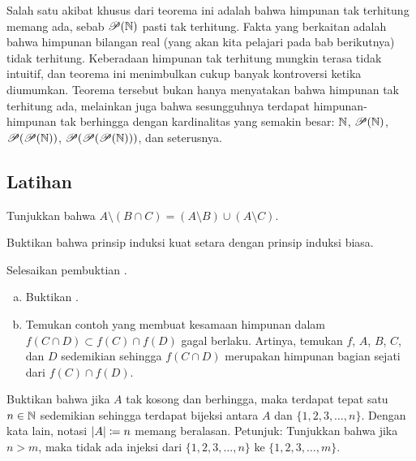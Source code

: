 Salah satu akibat khusus dari 
teorema ini adalah bahwa himpunan tak terhitung memang ada,
sebab ${\mathscr{P}}({\mathbb{N}})$ pasti tak terhitung.
Fakta yang berkaitan adalah bahwa
himpunan bilangan real (yang akan kita pelajari pada bab berikutnya) tidak terhitung.
Keberadaan himpunan tak terhitung mungkin terasa tidak intuitif, dan teorema ini
menimbulkan cukup banyak kontroversi ketika
diumumkan.  Teorema tersebut bukan hanya menyatakan bahwa himpunan tak terhitung ada,
melainkan juga bahwa sesungguhnya terdapat himpunan-himpunan tak berhingga dengan kardinalitas
yang semakin besar: ${\mathbb{N}}$, ${\mathscr{P}}({\mathbb{N}})$,
${\mathscr{P}}({\mathscr{P}}({\mathbb{N}}))$, ${\mathscr{P}}({\mathscr{P}}({\mathscr{P}}({\mathbb{N}})))$, dan seterusnya.

\subsection{Latihan}

\begin{exercise}
Tunjukkan bahwa
$A \setminus (B \cap C) = (A \setminus B) \cup (A \setminus C)$.
\end{exercise}

\begin{exercise}
Buktikan bahwa prinsip induksi kuat setara dengan prinsip induksi
biasa.
\end{exercise}

\begin{exercise}
Selesaikan pembuktian .
\end{exercise}

\begin{exercise}
\leavevmode
\begin{enumerate}[a)]
\item
Buktikan .
\item
Temukan contoh yang membuat kesamaan himpunan
dalam
$f( C \cap D) \subset f (C) \cap f (D)$
gagal berlaku.  Artinya, temukan $f$, $A$, $B$, $C$, dan $D$ sedemikian sehingga
$f( C \cap D)$ merupakan himpunan bagian sejati dari $f(C) \cap f(D)$.
\end{enumerate}
\end{exercise}

\begin{exercise}[Rumit]
Buktikan bahwa jika $A$ tak kosong dan berhingga, maka terdapat tepat satu
$n \in {\mathbb{N}}$ sedemikian
sehingga terdapat bijeksi antara $A$ dan $\{ 1, 2, 3, \ldots, n \}$.
Dengan kata lain, notasi $\lvert {A} \rvert \coloneqq n$ memang beralasan.
Petunjuk: Tunjukkan bahwa jika $n > m$, maka tidak ada injeksi dari
$\{ 1, 2, 3, \ldots, n \}$ ke
$\{ 1, 2, 3, \ldots, m \}$.
\end{exercise}


